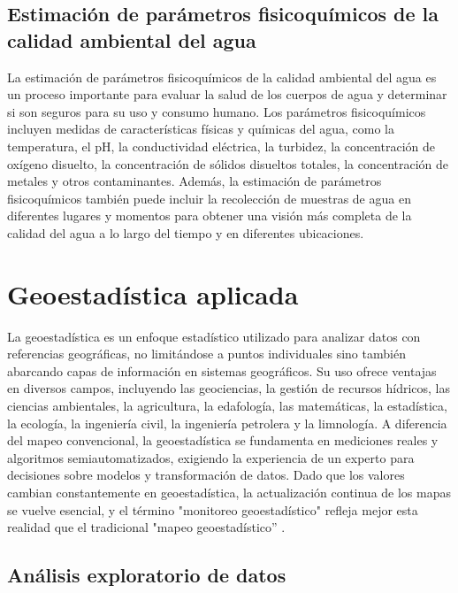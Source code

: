 \subsection{Estimación de parámetros fisicoquímicos de la calidad ambiental del agua}

La estimación de parámetros fisicoquímicos de la calidad ambiental del agua es un proceso importante para evaluar la salud de los cuerpos de agua y determinar si son seguros para su uso y consumo humano.
Los parámetros fisicoquímicos incluyen medidas de características físicas y químicas del agua, como la temperatura, el pH, la conductividad eléctrica, la turbidez, la concentración de oxígeno disuelto, la concentración de sólidos disueltos totales, la concentración de metales y otros contaminantes.
Además, la estimación de parámetros fisicoquímicos también puede incluir la recolección de muestras de agua en diferentes lugares y momentos para obtener una visión más completa de la calidad del agua a lo largo del tiempo y en diferentes ubicaciones.

\section{ Geoestadística aplicada}

La geoestadística es un enfoque estadístico utilizado para analizar datos con referencias geográficas, no limitándose a puntos individuales sino también abarcando capas de información en sistemas geográficos. Su uso ofrece ventajas en diversos campos, incluyendo las geociencias, la gestión de recursos hídricos, las ciencias ambientales, la agricultura, la edafología, las matemáticas, la estadística, la ecología, la ingeniería civil, la ingeniería petrolera y la limnología. A diferencia del mapeo convencional, la geoestadística se fundamenta en mediciones reales y algoritmos semiautomatizados, exigiendo la experiencia de un experto para decisiones sobre modelos y transformación de datos. Dado que los valores cambian constantemente en geoestadística, la actualización continua de los mapas se vuelve esencial, y el término "monitoreo geoestadístico" refleja mejor esta realidad que el tradicional "mapeo geoestadístico” \cite{Gidahatari2023}.

\subsection{Análisis exploratorio de datos}

